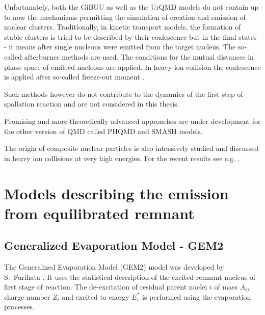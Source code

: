 Unfortunately, both the GiBUU as well as the UrQMD models do not contain up to now the mechanisms permitting the simulation of creation and emission of nuclear clusters. Traditionally, in kinetic transport models, the formation of stable clusters is tried to be described by their coalescence but in the final states - it means after single nucleons were emitted from the target nucleus.  
The so-called afterburner methods are used. The conditions for the mutual distances in phase space of emitted nucleons are applied. 
In heavy-ion collision the coalescence is applied after so-called freeze-out moment \cite{PhysRevC.21.1301,PhysRevC.60.031901,CHEN2003809,PhysRevC.98.014914}. 

Such methods however do not contribute to the 
dynamics of the first step of spallation reaction and are not considered in this thesis. 

Promising and more theoretically advanced approaches are under development for the other version of QMD called PHQMD \cite{PHQMD_PhysRevC.101.044905} and SMASH \cite{PhysRevC.94.054905} models.

The origin of composite nuclear particles is also intensively studied and discussed in heavy ion collisions at very high energies. For the recent results see e.g.  \cite{ALICE_PhysRevC.101.044906,acharya2020multiplicity}. 


\section{Models describing the emission from equilibrated remnant}

\subsection{Generalized Evaporation Model - GEM2}
\label{GEM}

The Generalized Evaporation Model (GEM2) model was developed by S.~Furihata \cite{FURIHATA2000,Furihata2002}. It uses the statistical description of the excited remnant nucleus of first stage of reaction. The de-excitation of residual parent nuclei $i$ of mass $A_i$, charge number $Z_i$ and excited to energy $E^{*}_i$ is performed using the evaporation  processes. \par
 
